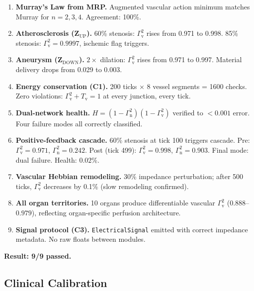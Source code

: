 ﻿\documentclass[aps,pre,twocolumn,superscriptaddress,floatfix]{revtex4-2}
\newcommand{\Gv}{\Gamma_{\mathrm{v}}}
\newcommand{\Gn}{\Gamma_{\mathrm{n}}}
\newcommand{\Tv}{T_{\mathrm{v}}}
\begin{document}
\begin{enumerate}
  \item[\textbf{V1.}] \textbf{Murray's Law from MRP.}
    Augmented vascular action minimum matches Murray for
    $n=2,3,4$. Agreement: 100\%.

  \item[\textbf{V2.}] \textbf{Atherosclerosis (Z$_{\text{UP}}$).}
    60\% stenosis: $\Gv^2$ rises from 0.971 to 0.998.
    85\% stenosis: $\Gv^2 = 0.9997$, ischemic flag triggers.

  \item[\textbf{V3.}] \textbf{Aneurysm (Z$_{\text{DOWN}}$).}
    $2\times$ dilation: $\Gv^2$ rises from 0.971 to 0.997.
    Material delivery drops from 0.029 to 0.003.

  \item[\textbf{V4.}] \textbf{Energy conservation (C1).}
    200 ticks $\times$ 8 vessel segments = 1600 checks.
    Zero violations: $\Gv^2 + \Tv = 1$ at every junction,
    every tick.

  \item[\textbf{V5.}] \textbf{Dual-network health.}
    $H = (1-\Gn^2)(1-\Gv^2)$ verified to $<0.001$ error.
    Four failure modes all correctly classified.

  \item[\textbf{V6.}] \textbf{Positive-feedback cascade.}
    60\% stenosis at tick 100 triggers cascade.
    Pre: $\Gv^2=0.971$, $\Gn^2=0.242$.
    Post (tick 499): $\Gv^2=0.998$, $\Gn^2=0.903$.
    Final mode: dual failure. Health: $0.02\%$.

  \item[\textbf{V7.}] \textbf{Vascular Hebbian remodeling.}
    30\% impedance perturbation; after 500 ticks, $\Gv^2$
    decreases by 0.1\% (slow remodeling confirmed).

  \item[\textbf{V8.}] \textbf{All organ territories.}
    10 organs produce differentiable vascular $\Gv^2$
    ($0.888$--$0.979$), reflecting organ-specific perfusion
    architecture.

  \item[\textbf{V9.}] \textbf{Signal protocol (C3).}
    \texttt{ElectricalSignal} emitted with correct impedance
    metadata. No raw floats between modules.
\end{enumerate}

\textbf{Result: 9/9 passed.}

\subsection{Clinical Calibration}\label{sec:clinical}
\end{document}

